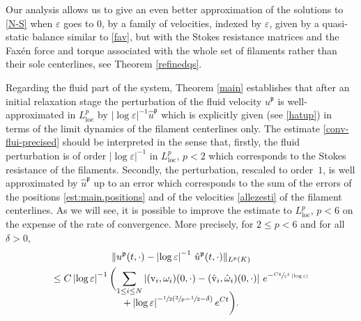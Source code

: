 \documentclass[JEP,XML,SOM,Unicode, NoEqCountersInSection,NoFloatCountersInSection,published]{cedram}
\let\eps\varepsilon
\newcommand{\loc}{\mathrm{loc}}
\theoremstyle{definition}
\theoremstyle{remark}
\begin{document}
Our analysis allows us to give an even better approximation of the solutions to \eqref{N-S} when $\eps$ goes to $0$,
by a family of velocities, indexed by $\eps$, given by a quasi-static balance similar to \eqref{fav}, but with the Stokes resistance matrices and the Faxén force and torque
associated with the whole set of filaments rather than their sole centerlines, see Theorem \ref{refinedqs}.

Regarding the fluid part of the system, Theorem \ref{main} establishes that
after an initial relaxation stage the perturbation of the fluid velocity ${u}^\mathfrak{p}$ is well-approximated in $L^p_\loc$ by $\left|\log \eps\right|^{-1} \hat {u}^\mathfrak{p}$ which is explicitly given (see \eqref{hatup}) in terms of the limit dynamics of the filament centerlines only. The estimate
\eqref{conv-flui-precised} should be interpreted in the sense that, firstly, the fluid perturbation is of order $\left|\log \eps\right|^{-1}$ in $L^p_\loc$, $p<2$ which corresponds to the Stokes resistance of the filaments. Secondly, the perturbation, rescaled to order~$1$, is well approximated by $ \hat {u}^\mathfrak{p}$ up to an error which corresponds to the sum of the errors of the positions \eqref{est:main.positions} and of the velocities \eqref{allezesti} of the filament centerlines.
As we will see, it is possible to improve the estimate to $L^p_\loc$, $p< 6$ on the expense of the rate of convergence. More precisely, for $2 \leq p < 6$ and for all $\delta > 0$,
\begin{multline}
\label{conv-flui-precised.comment}
\| u^\mathfrak{p}(t,\cdot) - \left|\log \eps\right|^{-1} \, {\hat u}^\mathfrak{p} (t,\cdot) \|_{L^p (K) } \\
\leq
C \left|\log \eps\right|^{-1} \biggl(\sum_{1 \leq i \leq N} \left| (\textrm{v}_i,\omega_i) (0,\cdot) - (\hat{\textrm{v}}_i,{\hat \omega}_i)(0,\cdot)
\right| \, e^{- \sfrac{C t}{\eps^2 \left|\log \eps\right|}}\\[-8pt]
+ \left|\log \eps\right|^{-\sfrac 1 2(\sfrac 3 p - \sfrac 1 2 - \delta)} e^{C t} \biggr).
\end{multline}
\end{document}

